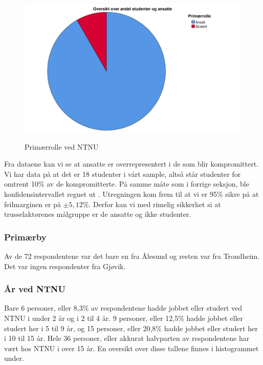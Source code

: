 \begin{figure}[H]
    \centering
    \includegraphics[scale=0.5]{case_2/bilder/spss/primaerrolle.pdf}
    \label{fig:case2-primaerrolle}
    \caption[Primærrolle ved NTNU]{Primærrolle ved NTNU}
\end{figure}

Fra dataene kan vi se at ansatte er overrepresentert i de som blir kompromittert. Vi har data på at det er 18 studenter i vårt sample, altså står studenter for omtrent 10\% av de kompromitterte. På samme måte som i forrige seksjon, ble konfidensintervallet regnet ut \cite{SSCalc}. Utregningen kom frem til at vi er 95\% sikre på at feilmarginen er på \(\pm 5,12\%\). Derfor kan vi med rimelig sikkerhet si at trusselaktørenes målgruppe er de ansatte og ikke studenter. 

\subsubsection{Primærby}
Av de 72 respondentene var det bare en fra Ålesund og resten var fra Trondheim. Det var ingen respondenter fra Gjøvik. 

\subsubsection{År ved NTNU}
Bare 6 personer, eller 8,3\% av respondentene hadde jobbet eller studert ved NTNU i under 2 år og i 2 til 4 år. 9 personer, eller 12,5\% hadde jobbet eller studert her i 5 til 9 år, og 15 personer, eller 20,8\% hadde jobbet eller studert her i 10 til 15 år. Hele 36 personer, eller akkurat halvparten av respondentene har vært hos NTNU i over 15 år. En oversikt over disse tallene finnes i histogrammet under. 

